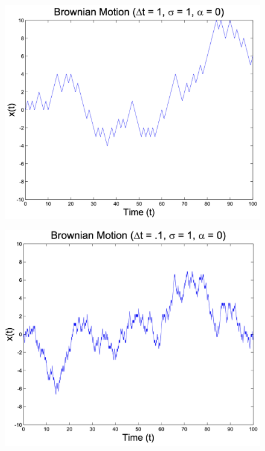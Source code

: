 \documentclass[11pt, aspectratio=169]{beamer}
\begin{document}
\begin{frame}{}
	\begin{figure}
		\includegraphics[scale=0.3]{./Brownian1}
	\end{figure}
\end{frame}


\begin{frame}{}
	\begin{figure}
		\includegraphics[scale=0.3]{./Brownian2}
	\end{figure}
\end{frame}
\end{document}
